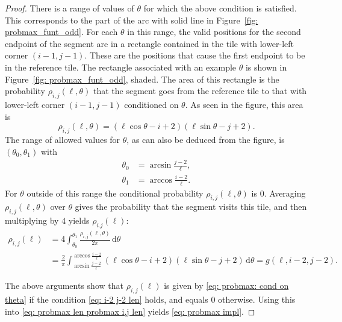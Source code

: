 \documentclass[12pt, a4paper]{article}
\newcommand{\diff}{\mathrm d}
\newcommand{\probmax}{\rho} %
\newcommand{\len}{\ell} %
\begin{document}
\begin{proof}
There is a range of values of $\theta$ for which the above condition is satisfied. This corresponds to the part of the arc with solid line in Figure~\ref{fig: probmax_funt_odd}. For each $\theta$ in this range, the valid positions for the second endpoint of the segment are in a rectangle contained in the tile with lower-left corner $(i-1,j-1)$. These are the positions that cause the first endpoint to be in the reference tile. The rectangle associated with an example $\theta$ is shown in Figure~\ref{fig: probmax_funt_odd}, shaded. The area of this rectangle is the probability $\probmax_{i, j}(\len,\theta)$ that the segment goes from the reference tile to that with lower-left corner $(i-1,j-1)$ conditioned on $\theta$. As seen in the figure, this area is
\begin{equation}
\label{eq: probmax: probmax theta odd}
\probmax_{i, j}(\len, \theta) = \left(\len\cos\theta - i+2\right) \left(\len\sin\theta - j + 2\right).
\end{equation}
The range of allowed values for $\theta$, as can also be deduced from the figure, is $(\theta_0, \theta_1)$ with
\begin{align}
\label{eq: odd theta 0}
\theta_0 & = \arcsin\frac{j-2}{\len}, \\
\label{eq: odd theta 1}
\theta_1 & = \arccos\frac{i-2}{\len}.
\end{align}
For $\theta$ outside of this range the conditional probability $\probmax_{i, j}(\len, \theta)$ is $0$. Averaging $\probmax_{i, j}(\len, \theta)$ over $\theta$ gives the probability that the segment visits this tile, and then multiplying by $4$ yields $\probmax_{i.j}(\len)$:
\begin{equation}
\begin{split}
\label{eq: probmax: cond on theta}
\probmax_{i,j}(\len) &= 4 \int_{\theta_0}^{\theta_1} \frac{\probmax_{i, j}(\len, \theta)}{2\pi} \, \diff \theta \\
&= \frac 2 {\pi} \int_{\arcsin\frac{j-2}{\len}}^{\arccos\frac{i-2}{\len}} \left( \len\cos\theta - i + 2 \right)  \left( \len\sin\theta - j + 2 \right) \, \diff \theta
= g( \len, i-2, j-2).
\end{split}
\end{equation}

The above arguments show that $\probmax_{i,j}(\len)$ is given by \eqref{eq: probmax: cond on theta} if the condition \eqref{eq: i-2 j-2 len} holds, and equals $0$ otherwise. Using this into \eqref{eq: probmax len probmax i,j len} yields \eqref{eq: probmax impl}.


\end{proof}
\end{document}
